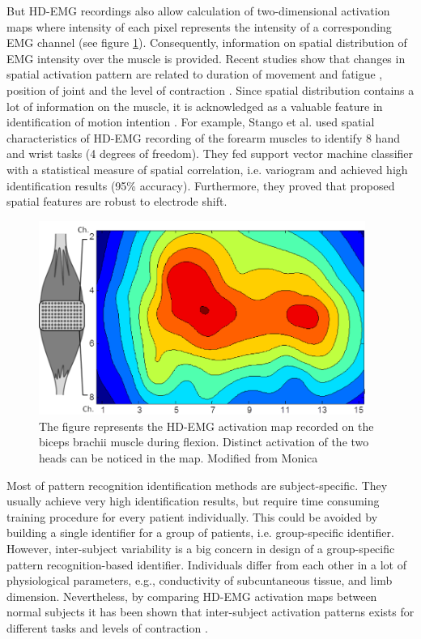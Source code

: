 But HD-EMG recordings also allow calculation of two-dimensional activation maps where intensity of each pixel represents the intensity of a corresponding EMG channel (see figure \ref{fig:HD-EMG}). Consequently, information on spatial distribution of EMG intensity over the muscle is provided. Recent studies show that changes in spatial activation pattern are related to duration of movement and fatigue \citep{Tucker2009, Staudenmann2014}, position of joint \citep{Vieira2010} and the level of contraction \citep{Holtermann2005}. Since spatial distribution contains a lot of information on the muscle, it is acknowledged as a valuable feature in identification of motion intention \citep{Stango2015, Hakonen2015, Rojas-Martinez2013}. For example, Stango et al. \citep{Stango2015} used spatial characteristics of HD-EMG recording of the forearm muscles to identify 8 hand and wrist tasks (4 degrees of freedom). They fed support vector machine classifier with a statistical measure of spatial correlation, i.e. variogram and achieved high identification results (95\% accuracy). Furthermore, they proved that proposed spatial features are robust to electrode shift.
\begin{figure}[ht]
\centering
\includegraphics[width=0.95\textwidth]{Images/introduction/HD-EMG.png}
\caption{The figure represents the HD-EMG activation map recorded on the biceps brachii muscle during flexion. Distinct activation of the two heads can be noticed in the map. Modified from Monica}
\label{fig:HD-EMG}
\end{figure}

Most of pattern recognition identification methods are subject-specific. They usually achieve very high identification results, but require time consuming training procedure for every patient individually. This could be avoided by building a single identifier for a group of patients, i.e. group-specific identifier. However, inter-subject variability is a big concern in design of a group-specific pattern recognition-based identifier. Individuals differ from each other in a lot of physiological parameters, e.g., conductivity of subcuntaneous tissue, and limb dimension. Nevertheless, by comparing HD-EMG activation maps between normal subjects it has been shown that inter-subject activation patterns exists for different tasks and levels of contraction \citep{Rojas-Martinez2012}.

